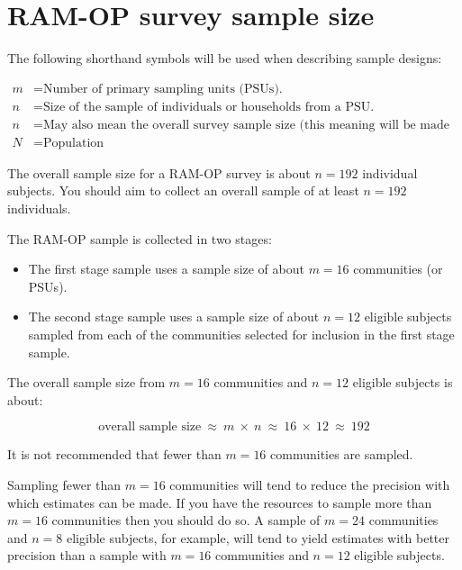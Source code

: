 \documentclass[12pt,a4paper]{book}
\theoremstyle{definition}
\theoremstyle{definition}
\theoremstyle{definition}
\theoremstyle{remark}
\begin{document}
\newpage

\hypertarget{ram-op-survey-sample-size}{%
\section{RAM-OP survey sample size}\label{ram-op-survey-sample-size}}

The following shorthand symbols will be used when describing sample
designs:

\begin{align*}
m &= \text{Number of primary sampling units (PSUs).} \\[2pt]
n &= \text{Size of the sample of individuals or households from a PSU.} \\[2pt]
n &= \text{May also mean the overall survey sample size (this meaning will be made clear in the text).} \\[2pt]
N &= \text{Population}
\end{align*}

The overall sample size for a RAM-OP survey is about \(n = 192\)
individual subjects. You should aim to collect an overall sample of at
least \(n = 192\) individuals.

The RAM-OP sample is collected in two stages:

\begin{itemize}
\item
  The first stage sample uses a sample size of about \(m = 16\)
  communities (or PSUs).
\item
  The second stage sample uses a sample size of about \(n = 12\)
  eligible subjects sampled from each of the communities selected for
  inclusion in the first stage sample.
\end{itemize}

The overall sample size from \(m = 16\) communities and \(n = 12\)
eligible subjects is about:

\[\text{overall sample size} ~ \approx ~ m ~ \times ~ n ~ \approx ~ 16 ~ \times ~ 12 ~ \approx ~ 192\]

It is not recommended that fewer than \(m = 16\) communities are
sampled.

Sampling fewer than \(m = 16\) communities will tend to reduce the
precision with which estimates can be made. If you have the resources to
sample more than \(m = 16\) communities then you should do so. A sample
of \(m = 24\) communities and \(n = 8\) eligible subjects, for example,
will tend to yield estimates with better precision than a sample with
\(m = 16\) communities and \(n = 12\) eligible subjects.
\end{document}
